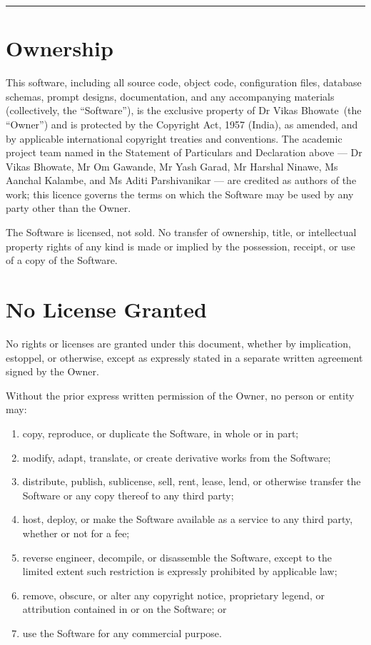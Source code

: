 \documentclass[11pt,a4paper]{article}
\newcommand{\OwnerName}{Dr Vikas Bhowate}
\begin{document}
\vspace{1em}
\noindent\rule{\linewidth}{0.6pt}
\vspace{0.5em}

\section{Ownership}

This software, including all source code, object code, configuration files,
database schemas, prompt designs, documentation, and any accompanying
materials (collectively, the ``Software''), is the exclusive property of
\OwnerName\ (the ``Owner'') and is protected by the Copyright Act, 1957
(India), as amended, and by applicable international copyright treaties and
conventions. The academic project team named in the Statement of
Particulars and Declaration above --- Dr Vikas Bhowate, Mr Om Gawande, Mr
Yash Garad, Mr Harshal Ninawe, Ms Aanchal Kalambe, and Ms Aditi
Parshivanikar --- are credited as authors of the work; this licence governs
the terms on which the Software may be used by any party other than the
Owner.

The Software is licensed, not sold. No transfer of ownership, title, or
intellectual property rights of any kind is made or implied by the
possession, receipt, or use of a copy of the Software.

\section{No License Granted}

No rights or licenses are granted under this document, whether by
implication, estoppel, or otherwise, except as expressly stated in a
separate written agreement signed by the Owner.

Without the prior express written permission of the Owner, no person or
entity may:

\begin{enumerate}
    \item copy, reproduce, or duplicate the Software, in whole or in part;
    \item modify, adapt, translate, or create derivative works from the
          Software;
    \item distribute, publish, sublicense, sell, rent, lease, lend, or
          otherwise transfer the Software or any copy thereof to any third
          party;
    \item host, deploy, or make the Software available as a service to any
          third party, whether or not for a fee;
    \item reverse engineer, decompile, or disassemble the Software, except
          to the limited extent such restriction is expressly prohibited by
          applicable law;
    \item remove, obscure, or alter any copyright notice, proprietary
          legend, or attribution contained in or on the Software; or
    \item use the Software for any commercial purpose.
\end{enumerate}
\end{document}
